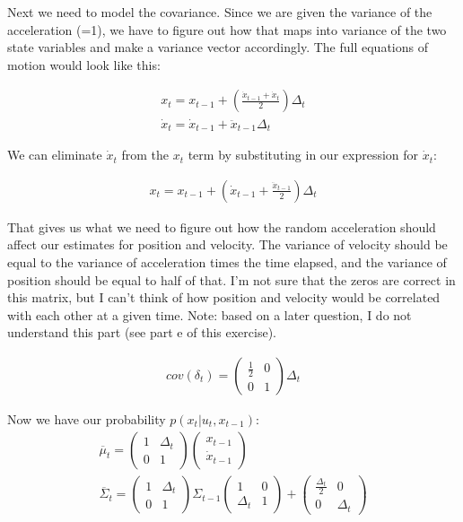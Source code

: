 \documentclass[10pt]{article}
\begin{document}
\begin{enumerate}
\begin{enumerate}
  Next we need to model the covariance. Since we are given the variance of the
  acceleration (=1), we have to figure out how that maps into variance of the
  two state variables and make a variance vector accordingly. The full equations
  of motion would look like this:

  \begin{gather}
    x_t = x_{t-1} + \left(\frac{\dot{x}_{t-1} + \dot{x}_t}{2}\right)\Delta_t\\
    \dot{x}_t = \dot{x}_{t-1} + \ddot{x}_{t-1}\Delta_t
  \end{gather}

  We can eliminate $\dot{x}_t$ from the $x_t$ term by substituting in our
  expression for $\dot{x}_t$:

  \begin{gather}
    x_t = x_{t-1} + \left(\dot{x}_{t-1} + \frac{\ddot{x}_{t-1}}{2}\right)\Delta_t
  \end{gather}

  That gives us what we need to figure out how the random acceleration should
  affect our estimates for position and velocity. The variance of velocity
  should be equal to the variance of acceleration times the time elapsed, and
  the variance of position should be equal to half of that. I'm not sure that
  the zeros are correct in this matrix, but I can't think of how position and
  velocity would be correlated with each other at a given time. Note: based on a
  later question, I do not understand this part (see part e of this exercise).

  \begin{gather}
  cov(\delta_t) = \begin{pmatrix}\frac{1}{2} & 0 \\ 0 &
  1\end{pmatrix}\Delta_t
  \end{gather}

  Now we have our probability $p(x_t | u_t,x_{t-1})$:
  \begin{gather}
  \overline{\mu}_t = \begin{pmatrix}1 & \Delta_t \\ 0 & 1\end{pmatrix}
  \begin{pmatrix}x_{t-1} \\ \dot{x}_{t-1}\end{pmatrix}\\
  \overline{\Sigma}_t = \begin{pmatrix}1 & \Delta_t \\ 0 & 1\end{pmatrix}
    \Sigma_{t-1}
  \begin{pmatrix}1 & 0 \\ \Delta_t & 1\end{pmatrix} + 
  \begin{pmatrix}\frac{\Delta_t}{2} & 0 \\ 0 & \Delta_t\end{pmatrix}
  \end{gather}



\end{enumerate}
\end{enumerate}
\end{document}

